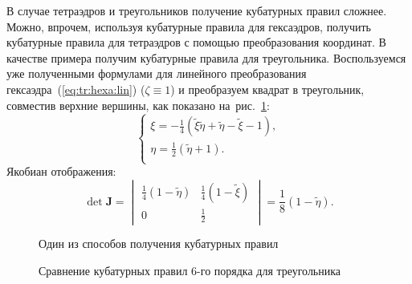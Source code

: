 В случае тетраэдров и треугольников получение кубатурных правил сложнее. Можно, впрочем, используя кубатурные правила для гексаэдров, получить кубатурные правила для тетраэдров с помощью преобразования координат. В качестве примера получим кубатурные правила для треугольника. Воспользуемся уже полученными формулами для линейного преобразования гексаэдра~(\ref{eq:tr:hexa:lin}) (\(\zeta \equiv 1\)) и преобразуем квадрат в треугольник, совместив верхние вершины, как показано на~рис.~\ref{pic:cub:tri:first}:
\begin{equation}\label{eq:totri}
\left\{\begin{array}{l}
\xi = -\frac{1}{4} (\tilde{\xi}\tilde{\eta} + \tilde{\eta} - \tilde{\xi} - 1), \\
\eta = \frac{1}{2} (\tilde{\eta} + 1). \\
\end{array} \right.
\end{equation}
Якобиан отображения:
\[
\det\mathbf J =
\begin{vmatrix}
\frac{1}{4} (1 - \tilde{\eta}) & \frac{1}{4} (1 - \tilde{\xi}) \\
0 & \frac{1}{2}
\end{vmatrix} = \frac{1}{8} (1 - \tilde{\eta}).
\]

\begin{figure}[h]
	{\centering
		\hfill
		\hfill
		\hfill
	}
	\caption{Один из способов получения кубатурных правил}
	\label{pic:cub:tri:first}
\end{figure}

\begin{figure}[h]
	{\centering
		\hfill
		\hfill
		\hfill
	}
	\caption{Сравнение кубатурных правил 6-го порядка для треугольника}
	\label{pic:cub:comparasion}
\end{figure}

